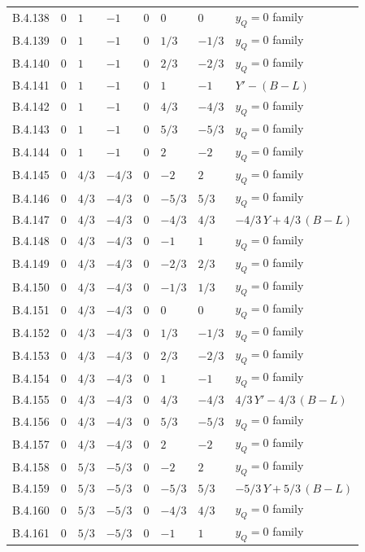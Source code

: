 {\begin{longtable}{@{}lllllll>{\raggedright\arraybackslash}p{5.6cm}@{}}
B.4.138 & $0$ & $1$ & $-1$ & $0$ & $0$ & $0$ & $y_Q=0$ family \\
B.4.139 & $0$ & $1$ & $-1$ & $0$ & $1/3$ & $-1/3$ & $y_Q=0$ family \\
B.4.140 & $0$ & $1$ & $-1$ & $0$ & $2/3$ & $-2/3$ & $y_Q=0$ family \\
B.4.141 & $0$ & $1$ & $-1$ & $0$ & $1$ & $-1$ & $Y'-(B{-}L)$ \\
B.4.142 & $0$ & $1$ & $-1$ & $0$ & $4/3$ & $-4/3$ & $y_Q=0$ family \\
B.4.143 & $0$ & $1$ & $-1$ & $0$ & $5/3$ & $-5/3$ & $y_Q=0$ family \\
B.4.144 & $0$ & $1$ & $-1$ & $0$ & $2$ & $-2$ & $y_Q=0$ family \\
B.4.145 & $0$ & $4/3$ & $-4/3$ & $0$ & $-2$ & $2$ & $y_Q=0$ family \\
B.4.146 & $0$ & $4/3$ & $-4/3$ & $0$ & $-5/3$ & $5/3$ & $y_Q=0$ family \\
B.4.147 & $0$ & $4/3$ & $-4/3$ & $0$ & $-4/3$ & $4/3$ & $-4/3\,Y+4/3\,(B{-}L)$ \\
B.4.148 & $0$ & $4/3$ & $-4/3$ & $0$ & $-1$ & $1$ & $y_Q=0$ family \\
B.4.149 & $0$ & $4/3$ & $-4/3$ & $0$ & $-2/3$ & $2/3$ & $y_Q=0$ family \\
B.4.150 & $0$ & $4/3$ & $-4/3$ & $0$ & $-1/3$ & $1/3$ & $y_Q=0$ family \\
B.4.151 & $0$ & $4/3$ & $-4/3$ & $0$ & $0$ & $0$ & $y_Q=0$ family \\
B.4.152 & $0$ & $4/3$ & $-4/3$ & $0$ & $1/3$ & $-1/3$ & $y_Q=0$ family \\
B.4.153 & $0$ & $4/3$ & $-4/3$ & $0$ & $2/3$ & $-2/3$ & $y_Q=0$ family \\
B.4.154 & $0$ & $4/3$ & $-4/3$ & $0$ & $1$ & $-1$ & $y_Q=0$ family \\
B.4.155 & $0$ & $4/3$ & $-4/3$ & $0$ & $4/3$ & $-4/3$ & $4/3\,Y'-4/3\,(B{-}L)$ \\
B.4.156 & $0$ & $4/3$ & $-4/3$ & $0$ & $5/3$ & $-5/3$ & $y_Q=0$ family \\
B.4.157 & $0$ & $4/3$ & $-4/3$ & $0$ & $2$ & $-2$ & $y_Q=0$ family \\
B.4.158 & $0$ & $5/3$ & $-5/3$ & $0$ & $-2$ & $2$ & $y_Q=0$ family \\
B.4.159 & $0$ & $5/3$ & $-5/3$ & $0$ & $-5/3$ & $5/3$ & $-5/3\,Y+5/3\,(B{-}L)$ \\
B.4.160 & $0$ & $5/3$ & $-5/3$ & $0$ & $-4/3$ & $4/3$ & $y_Q=0$ family \\
B.4.161 & $0$ & $5/3$ & $-5/3$ & $0$ & $-1$ & $1$ & $y_Q=0$ family \\

\end{longtable}}
